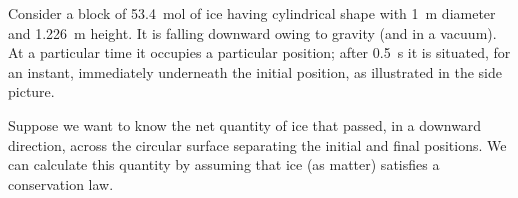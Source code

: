 \documentclass[a4paper,12pt,%
onecolumn,oneside,%
british%
]{memoir}
\renewcommand*{\|}[1][]{\nonscript\:#1\vert\nonscript\:\mathopen{}}
\begin{document}
Consider a block of \qty{53.4}{mol} of ice having cylindrical shape with \qty{1}{m} diameter and \qty{1.226}{m} height. It is falling downward owing to gravity (and in a vacuum). At a particular time it occupies a particular position; after \qty{0.5}{s} it is situated, for an instant, immediately underneath the initial position, as illustrated in the side picture.
%

Suppose we want to know the net quantity of ice that passed, in a downward direction, across the circular surface separating the initial and final positions. We can calculate this quantity by assuming that ice (as matter) satisfies a conservation law.
\end{document}
